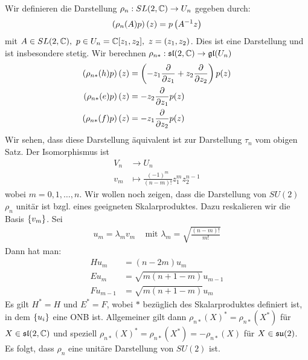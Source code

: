 Wir definieren die Darstellung $\rho_n : SL(2,\mathbb{C}) \rightarrow U_n$
gegeben durch:
\begin{align*}
    \left( \rho_n (A) p \right)(z) = p \left( A^{-1} z \right)
\end{align*}
mit $A \in SL(2,\C) , \ p \in U_n = \C[z_1,z_2] , \ z=(z_1,z_2)$. Dies ist
eine Darstellung und ist insbesondere stetig. Wir berechnen $\rho_{n\ast}:
\mathfrak{sl}(2,\mathbb{C}) \rightarrow \mathfrak{gl}(U_n)$
\begin{align*}
    \left( \rho_{n \ast}(h)p \right)(z) &= \left( - z_1 \frac{\partial}{\partial z_1} + z_2 \frac{\partial}{\partial z_2} \right) p(z)
    \\
    \left( \rho_{n \ast}(e)p \right)(z) &= - z_2 \frac{\partial}{\partial z_1} p(z)
    \\
    \left( \rho_{n \ast}(f)p \right)(z) &= - z_1 \frac{\partial}{\partial z_2} p(z)
\end{align*}
Wir sehen, dass diese Darstellung äquivalent ist zur Darstellung $\tau_n$
vom obigen Satz. Der Isomorphismus ist
\begin{align*}
    V_n &\rightarrow U_n
    \\
    v_m &\mapsto \frac{(-1)^m}{(n-m)!} z_1^m z_2^{n-1}
\end{align*}
wobei $m=0,1,\dots,n$. Wir wollen noch zeigen, dass die Darstellung
von $SU(2)$ $\rho_n$ unitär ist bzgl. eines geeigneten Skalarproduktes.
Dazu reskalieren wir die Basis $\left\{ v_m \right\}$. Sei
\begin{align*}
    u_m = \lambda_m v_m
    \hspace{10pt} \text{ mit }
    \lambda_m = \sqrt{\frac{(n-m)!}{m!}}
\end{align*}
Dann hat man:
\begin{align*}
    H u_m &= (n-2m) u_m \\
    E u_m &= \sqrt{m(n+1-m)} u_{m-1} \\
    F u_{m-1} &= \sqrt{m(n+1-m)} u_m
\end{align*}
Es gilt $H^\ast = H$ und $E^\ast = F$, wobei $\ast$ bezüglich des Skalarproduktes
definiert ist, in dem $\left\{ u_i \right\}$ eine ONB ist. Allgemeiner gilt
dann $\rho_{n \ast}(X)^\ast = \rho_{n \ast} (X^\ast)$ für $X \in \mathfrak{sl}(2,\mathbb{C})$
und speziell $\rho_{n \ast}(X)^\ast = \rho_{n \ast} (X^\ast) = - \rho_{n \ast} (X)$
für $X \in \mathfrak{su}(2)$. Es folgt, dass $\rho_n$ eine unitäre Darstellung von $SU(2)$
ist.

